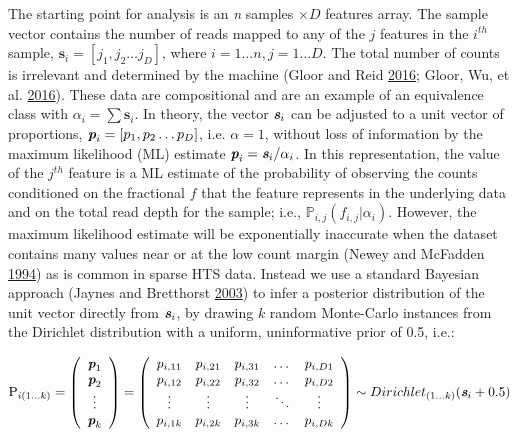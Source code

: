 \documentclass[onecolumn]{book}
\theoremstyle{definition}
\theoremstyle{definition}
\theoremstyle{definition}
\theoremstyle{remark}
\begin{document}
The starting point for analysis is an \emph{n} samples \(\times D\)
features array. The sample vector contains the number of reads mapped to
any of the \(j\) features in the \(i^{th}\) sample,
\(\textbf{s}_i=[j_1,j_2 \ldots j_D]\), where
\(i=1 \ldots n , j=1 \ldots D\). The total number of counts is
irrelevant and determined by the machine (Gloor and Reid
\protect\hyperlink{ref-Gloor:2016cjm}{2016}; Gloor, Wu, et al.
\protect\hyperlink{ref-gloor2016s}{2016}). These data are compositional
and are an example of an equivalence class with
\(\alpha_{i} = \sum \textbf{s}_{i}\). In theory, the vector
\(\textit{\textbf{s}}_i\) can be adjusted to a unit vector of
proportions, \({\textit{\textbf{p}}_i=[p_1,p_2 \ldots p_D] }\), i.e.
\(\alpha=1\), without loss of information by the maximum likelihood (ML)
estimate \(\textit{\textbf{p}}_i=\textit{\textbf{s}}_i / \alpha_{i}\).
In this representation, the value of the \(j^{th}\) feature is a ML
estimate of the probability of observing the counts conditioned on the
fractional \(f\) that the feature represents in the underlying data and
on the total read depth for the sample; i.e.,
\(\mathbb{P}_{i,j}(f_{i,j}|\alpha_i)\). However, the maximum likelihood
estimate will be exponentially inaccurate when the dataset contains many
values near or at the low count margin (Newey and McFadden
\protect\hyperlink{ref-Newey:1994}{1994}) as is common in sparse HTS
data. Instead we use a standard Bayesian approach (Jaynes and Bretthorst
\protect\hyperlink{ref-Jaynes:2003}{2003}) to infer a posterior
distribution of the unit vector directly from \(\textit{\textbf{s}}_i\),
by drawing \(k\) random Monte-Carlo instances from the Dirichlet
distribution with a uniform, uninformative prior of 0.5, i.e.:

\parbox[b]{7in}{
\begin{equation}
\textrm{P}_{i (1 \ldots k)}=
\left( \begin{array}{c}
    \textit{\textbf{p}}_1 \\
   \textit{\textbf{p}}_2 \\
    \vdots \\
    \textit{\textbf{p}}_k \\
\end{array} \right)=
\left( \begin{array}{ccccc}
    p_{i,11} & p_{i,21} & p_{i,31} & \dots  & p_{i,D1} \\
    p_{i,12} & p_{i,22} & p_{i,32} & \dots  & p_{i,D2} \\
    \vdots & \vdots & \vdots & \ddots & \vdots \\
    p_{i,1k} & p_{i,2k} & p_{i,3k} & \dots  & p_{i,Dk}\\
\end{array} \right)
\sim Dirichlet_{(1 \ldots k)}(\textit{\textbf{s}}_i + 0.5)
\label{eq:matrix}
\end{equation}
}
\end{document}
